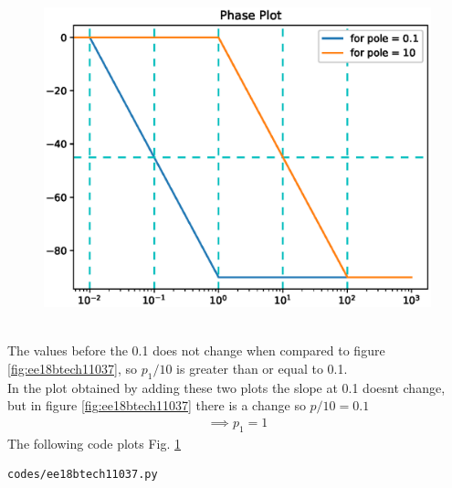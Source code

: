 \begin{enumerate}[label=\thesubsection.\arabic*.,ref=\thesubsection.\theenumi]
\begin{figure}[!ht]
\centering
\includegraphics[width=\columnwidth]{figs/ee18btech11037/ee18btech11037_2.eps}
\caption{}
\label{fig:ee18btech11037_2}
\end{figure}
\\
The values before the 0.1 does not change when compared to figure \ref{fig:ee18btech11037}, so $p_1/10$ is greater than or equal to 0.1.
\\
In the plot obtained by adding these two plots the slope at 0.1 doesnt change, but in figure \ref{fig:ee18btech11037} there is a change so $p/10 = 0.1 $ 
\begin{align}
\implies p_1 = 1
\end{align}
The following code plots Fig. \ref{fig:ee18btech11037_2}

\begin{lstlisting}
codes/ee18btech11037.py
\end{lstlisting}

\end{enumerate}

